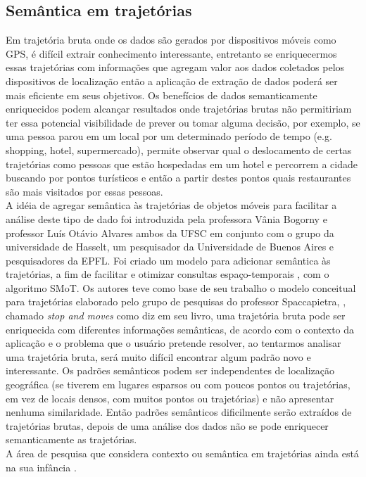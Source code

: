 \documentclass[	12pt, Times, openright, twoside, a4paper, english, brazil]{abntex2}
\begin{document}
\subsection{Semântica em trajetórias}
Em trajetória bruta onde os dados são gerados por dispositivos móveis como GPS, é difícil extrair conhecimento interessante, entretanto se enriquecermos essas trajetórias com informações que agregam valor aos dados coletados pelos dispositivos de localização então a aplicação de extração de dados poderá ser mais eficiente em seus objetivos. Os benefícios de dados semanticamente enriquecidos podem alcançar resultados onde trajetórias brutas não permitiriam ter essa potencial visibilidade de prever ou tomar alguma decisão, por exemplo, se uma pessoa parou em um local por um determinado período de tempo (e.g. shopping, hotel, supermercado), permite observar qual o deslocamento de certas trajetórias como pessoas que estão hospedadas em um hotel e percorrem a cidade buscando por pontos turísticos e então a partir destes pontos quais restaurantes são mais visitados por essas pessoas.\\
\indent A idéia de agregar semântica às trajetórias de objetos móveis para facilitar a análise deste tipo de dado foi introduzida pela professora Vânia Bogorny e professor Luís Otávio Alvares ambos da UFSC em conjunto com o grupo da universidade de Hasselt, um pesquisador da Universidade de Buenos Aires e pesquisadores da EPFL. Foi criado um modelo para adicionar semântica às trajetórias, a fim de facilitar e otimizar consultas espaço-temporais \cite{alvares2007}, com o algoritmo SMoT. Os autores teve como base de seu trabalho o modelo conceitual para trajetórias elaborado pelo grupo de pesquisas do professor Spaccapietra, \cite{Spaccapietra2008}, chamado \textit{stop and moves} como \cite{Bogorny2012} diz em seu livro, uma trajetória bruta pode ser enriquecida com diferentes informações semânticas, de acordo com o contexto da aplicação e o problema que o usuário pretende resolver, ao tentarmos analisar uma trajetória bruta, será muito difícil encontrar algum padrão novo e interessante. Os padrões semânticos podem ser independentes de localização geográfica (se tiverem em lugares esparsos ou com poucos pontos ou trajetórias, em vez de locais densos, com muitos pontos ou trajetórias) e não apresentar nenhuma similaridade. Então padrões semânticos dificilmente serão extraídos de trajetórias brutas, depois de uma análise dos dados não se pode enriquecer semanticamente as trajetórias.\\
\indent	A área de pesquisa que considera contexto ou semântica em trajetórias ainda está na sua infância \cite{Bogorny2012}. 
\end{document}
